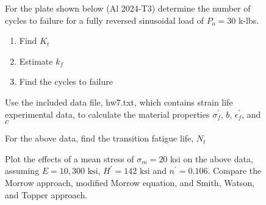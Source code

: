 \documentclass[12pt, oneside]{article}
\begin{document}
\begin{enumerate}

\begin{figure}[H]
	\item For the plate shown below (Al 2024-T3) determine the number of cycles to failure for a fully reversed sinusoidal load of $P_a = 30$ k-lbs.
	\begin{enumerate}
		\item Find $K_t$
		\item Estimate $k_f$
		\item Find the cycles to failure
	\end{enumerate}
	\centering
	\label{fig:problem3}
\end{figure}

\begin{figure}[H]
	\item Use the included data file, hw7.txt, which contains strain life experimental data, to calculate the material properties $\sigma_f^\prime$, $b$, $\epsilon_f^\prime$, and $c$
\end{figure}

\begin{figure}[H]
	\item For the above data, find the transition fatigue life, $N_t$
\end{figure}

\begin{figure}[H]
	\item Plot the effects of a mean stress of $\sigma_m = 20$ ksi on the above data, assuming $E = 10,300 \text{ ksi}$, $H^\prime = 142 \text{ ksi}$ and $n^\prime = 0.106$. Compare the Morrow approach, modified Morrow equation, and Smith, Watson, and Topper approach.
\end{figure}

\end{enumerate}
\end{document}
